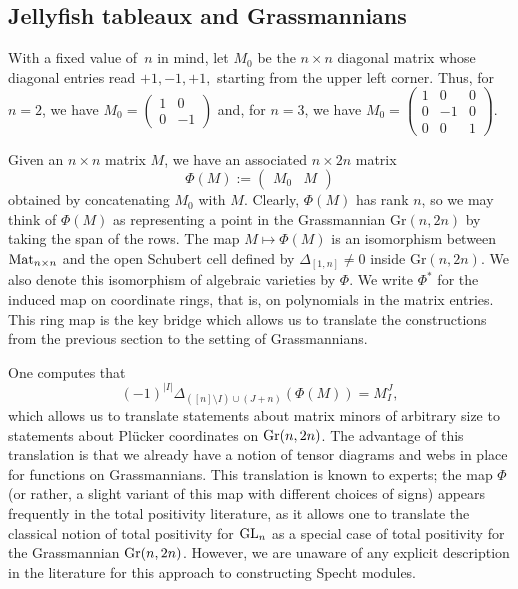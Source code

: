 \documentclass[ALCO, Unicode]{cedram}
\numberwithin{equation}{section}
\newcommand{\Gr}{\mathrm{Gr}}
\begin{document}
\subsection{Jellyfish tableaux and Grassmannians}\label{sec:jellyfish_on_Gr}
With a fixed value of~$n$ in mind, let 
$M_0$ be the $n \times n$ diagonal matrix whose diagonal entries read $+1,-1,+1,$ starting from the upper left corner. Thus, for $n=2$, we have $M_0 = \begin{pmatrix}
1 & 0 \\ 0 & -1
\end{pmatrix}$
and, for $n=3$, we have
$M_0 = \begin{pmatrix}
1 &  0 & 0 \\ 0 & -1 & 0 \\ 0 & 0 & 1
\end{pmatrix}$.

 
Given an $n \times n$ matrix $M$, we have an associated $n \times 2n $ matrix 
\begin{equation}\label{eq:Phi}
\Phi(M) := \begin{pmatrix}
M_0 & {M} 
\end{pmatrix}
\end{equation}
obtained by concatenating $M_0$ with $M$.
Clearly, $\Phi(M)$ has rank $n$, so we may think of $\Phi(M)$ as representing a point in the Grassmannian $\Gr(n,2n)$ by taking the span of the rows. The map $M \mapsto \Phi(M)$ is an isomorphism between ${\rm Mat}_{n \times n}$ and the open Schubert cell defined by $\Delta_{[1,n]} \neq 0$ inside 
$\Gr(n,2n)$. We also denote this isomorphism of algebraic varieties by $\Phi$. We write $\Phi^*$ for the induced map on coordinate rings, that is, on polynomials in the matrix entries. This ring map is the key bridge which allows us to translate the constructions from the previous section to the setting of Grassmannians.

 
One computes that
\begin{equation}\label{eq:PlutoMinor}
(-1)^{|I|}\Delta_{([n]\setminus I) \cup (J+n)}(\Phi(M)) = M_I^J,
\end{equation}
which allows us to translate statements about matrix minors of arbitrary size to statements about Pl\"ucker coordinates on ${\rm Gr}(n,2n)$. The advantage of this translation is that we already have a notion of tensor diagrams and webs in place for functions on Grassmannians. This translation is known to experts; the map $\Phi$ (or rather, a slight variant of this map with different choices of signs) appears frequently in the total positivity literature, as it allows one to translate the classical notion of total positivity for ${\rm GL}_n$ as a special case of total positivity for the Grassmannian ${\rm Gr}(n,2n)$. However, we are unaware of any explicit description in the literature for this approach to constructing Specht modules.
\end{document}

